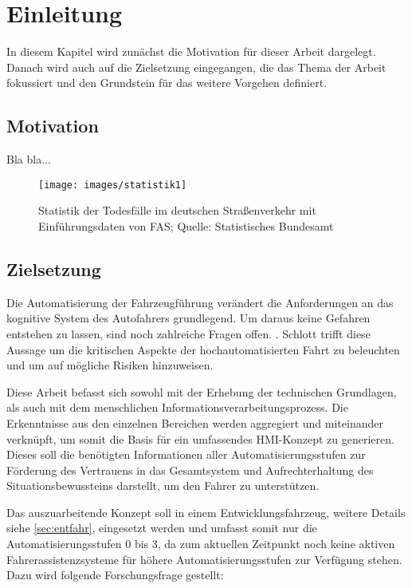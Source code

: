 \section{Einleitung}
\label{key}
In diesem Kapitel wird zunächst die Motivation für dieser Arbeit dargelegt. Danach wird auch auf die Zielsetzung eingegangen, die das Thema der Arbeit fokussiert und den Grundstein für das weitere Vorgehen definiert.

\subsection{Motivation}
Bla bla...
\begin{figure}[H]
	\centering
	\texttt{[image: images/statistik1]}
	\caption[Verlauf der Anzahl an Todesopfer im deutschen Straßenverkehr von 1953 bis 2016 in Kombination mit Einführung von Fahrerassistenzsystemen]{Statistik der Todesfälle im deutschen Straßenverkehr mit Einführungsdaten von FAS; Quelle: Statistisches Bundesamt \protect\cite{sba}}  
	\label{fig:sba}
\end{figure}

\subsection{Zielsetzung}
\glqq Die Automatisierung der Fahrzeugführung verändert die Anforderungen an das kognitive System des Autofahrers grundlegend. Um daraus keine Gefahren entstehen zu lassen, sind noch zahlreiche Fragen offen.\grqq{} \cite{schlott}. Schlott trifft diese Aussage um die kritischen Aspekte der hochautomatisierten Fahrt zu beleuchten und um auf mögliche Risiken hinzuweisen. 

Diese Arbeit befasst sich sowohl mit der Erhebung der technischen Grundlagen, als auch mit dem menschlichen Informationsverarbeitungsprozess. Die Erkenntnisse aus den einzelnen Bereichen werden aggregiert und miteinander verknüpft, um somit die Basis für ein umfassendes HMI-Konzept zu generieren. Dieses soll die benötigten Informationen aller Automatisierungsstufen zur Förderung des Vertrauens in das Gesamtsystem und Aufrechterhaltung des Situationsbewussteins darstellt, um den Fahrer zu unterstützen. 

Das auszuarbeitende Konzept soll in einem Entwicklungsfahrzeug, weitere Details siehe \autoref{sec:entfahr}, eingesetzt werden und umfasst somit nur die Automatisierungsstufen 0 bis 3, da zum aktuellen Zeitpunkt noch keine aktiven Fahrerassistenzsysteme für höhere Automatisierungsstufen zur Verfügung stehen. Dazu wird folgende Forschungsfrage gestellt: \\

